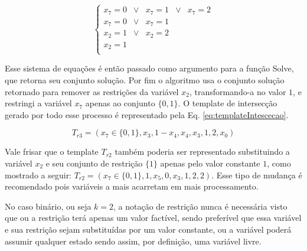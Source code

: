 \begin{equation}
\left\{\begin{matrix}
x_7	  = 0 	& \vee &	x_7	=	1 & \vee &	x_7	= 2	\\ 
x_7   = 0 	& \vee &	x_7	=	1					\\ 
x_2   = 1 	& \vee &	x_2	=	2					\\ 
x_2	  =	1											\\ 
\end{matrix}\right.
\label{eq:interseccaoRestrita}
\end{equation}

Esse sistema de equações é então passado como argumento para a função Solve, que retorna seu conjunto solução. Por fim o algoritmo usa o conjunto solução retornado para remover as restrições da variável $x_2$, transformando-a no valor $1$, e restringi a variável $x_7$ apenas ao conjunto $\{0,1\}$. O template de intersecção gerado por todo esse processo é representado pela Eq. \eqref{eq:templateIntescecao}.

\begin{equation}
T_{r3} = (x_7 \in \{0,1\}, x_3, 1-x_4, x_4, x_3, 1, 2, x_0)
\label{eq:templateIntescecao}
\end{equation}

Vale frisar que o template $T_{r2}$ também poderia ser representado substituindo a variável $x_2$ e seu conjunto de restrição $\{1\}$ apenas pelo valor constante $1$, como mostrado a seguir: $T_{r2} = (x_7 \in \{0,1\}, 1, x_5, 0, x_3, 1, 2, 2)$. Esse tipo de mudança é recomendado pois variáveis a mais acarretam em mais processamento.

No caso binário, ou seja $k = 2$, a notação de restrição nunca é necessária visto que ou a restrição terá apenas um valor factível, sendo preferível que essa variável e sua restrição sejam substituídas por um valor constante, ou a variável poderá assumir qualquer estado sendo assim, por definição, uma variável livre.
